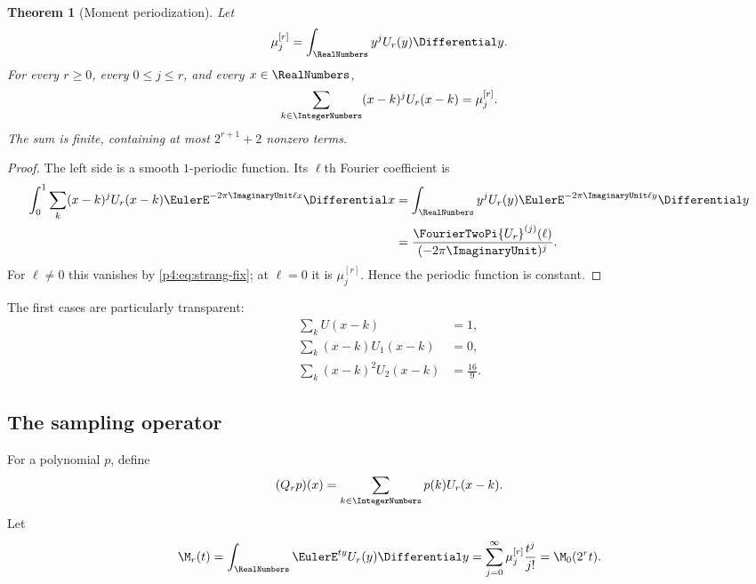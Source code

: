 \documentclass[11pt]{article}
\numberwithin{equation}{section}
\newtheorem{theorem}{Theorem}[section]
\theoremstyle{definition}
\theoremstyle{remark}
\begin{document}
\begin{theorem}[Moment periodization]
\label{p4:thm:moment-periodization}
Let
\begin{equation}
 \mu_j^{[r]}=\int_{\RealNumbers}y^jU_r(y)\Differential y.
 \label{p4:eq:scaled-moments}
\end{equation}
For every $r\ge0$, every $0\le j\le r$, and every $x\in\RealNumbers$,
\begin{equation}
 \sum_{k\in\IntegerNumbers}(x-k)^jU_r(x-k)=\mu_j^{[r]}.
 \label{p4:eq:moment-periodization}
\end{equation}
The sum is finite, containing at most $2^{r+1}+2$ nonzero terms.
\end{theorem}

\begin{proof}
The left side is a smooth $1$-periodic function.  Its $\ell$th Fourier coefficient is
\begin{align*}
 \int_0^1\sum_k(x-k)^jU_r(x-k)\EulerE^{-2\pi\ImaginaryUnit\ell x}\Differential x
 &=\int_{\RealNumbers}y^jU_r(y)\EulerE^{-2\pi\ImaginaryUnit\ell y}\Differential y\\
 &=\frac{\FourierTwoPi{U_r}^{(j)}(\ell)}{(-2\pi\ImaginaryUnit)^j}.
\end{align*}
For $\ell\ne0$ this vanishes by \eqref{p4:eq:strang-fix}; at $\ell=0$ it is $\mu_j^{[r]}$.  Hence the periodic function is constant.
\end{proof}

The first cases are particularly transparent:
\begin{align}
 \sum_kU(x-k)&=1,
 \label{p4:eq:partition-unity}\\
 \sum_k(x-k)U_1(x-k)&=0,
 \label{p4:eq:first-moment-periodization}\\
 \sum_k(x-k)^2U_2(x-k)&=\frac{16}{9}.
 \label{p4:eq:second-moment-periodization}
\end{align}

\subsection{The sampling operator}
For a polynomial $p$, define
\begin{equation}
 (Q_rp)(x)=\sum_{k\in\IntegerNumbers}p(k)U_r(x-k).
 \label{p4:eq:sampling-operator}
\end{equation}
Let
\begin{equation}
 \M_r(t)=\int_{\RealNumbers}\EulerE^{ty}U_r(y)\Differential y
 =\sum_{j=0}^{\infty}\mu_j^{[r]}\frac{t^j}{j!}
 =\M_0(2^rt).
 \label{p4:eq:Mr}
\end{equation}
\end{document}
